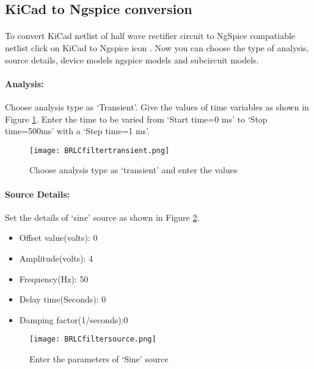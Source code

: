 \subsection*{KiCad to Ngspice conversion}

\paragraph{} To convert KiCad netlist of half wave rectifier circuit to NgSpice
compatiable netlist click on KiCad to Ngspice icon .  Now you can choose the type of analysis, source details, device models ngspice models and subcircuit models.


%

\paragraph{Analysis:}Choose analysis type as `Transient'. Give the values of time variables as shown in Figure \ref{HRLCfiltertransient}. Enter the time to be varied from `Start time=0 ms' to `Stop time=500ms' with a `Step time=1 ms'.

\begin{figure}[h]
\centering
\texttt{[image: BRLCfiltertransient.png]}
\caption{Choose analysis type as `transient' and enter the values}
\label{HRLCfiltertransient}
\end{figure}

\paragraph{Source Details:} Set the details of `sine' source as shown in Figure \ref{HRLCfiltersource}.
\begin{itemize}
\item
Offset value(volts): 0
\item
Amplitude(volts): 4
\item
Frequency(Hz): 50
\item
Delay time(Seconds): 0
\item
Damping factor(1/seconds):0

\end{itemize}
\begin{figure}[h]
\centering
\texttt{[image: BRLCfiltersource.png]}
\caption{Enter the parameters of `Sine' source}
\label{HRLCfiltersource}
\end{figure}


